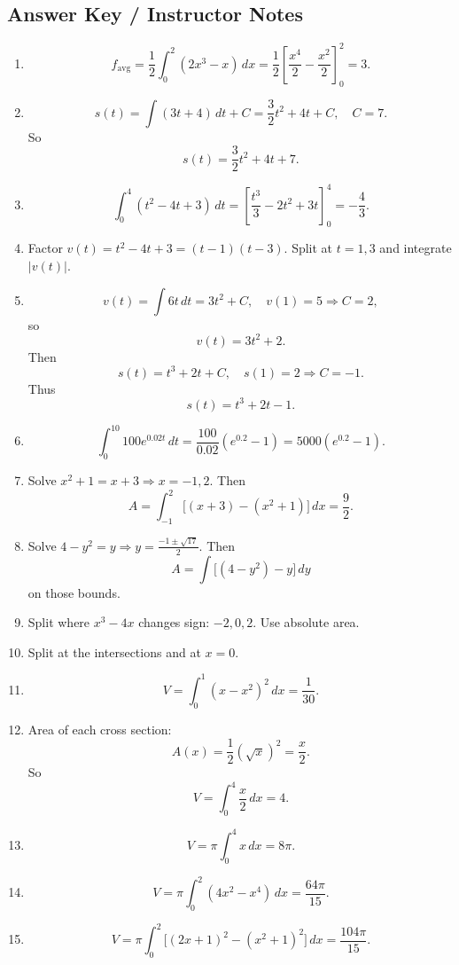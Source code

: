 \documentclass[11pt]{article}
\begin{document}
\newpage
\subsection{Answer Key / Instructor Notes}

\begin{enumerate}
    \item
    \[
    f_{\mathrm{avg}}=\frac12\int_0^2(2x^3-x)\,dx=\frac12\left[\frac{x^4}{2}-\frac{x^2}{2}\right]_0^2=3.
    \]

    \item
    \[
    s(t)=\int(3t+4)\,dt+C=\frac32 t^2+4t+C,\quad C=7.
    \]
    So
    \[
    s(t)=\frac32 t^2+4t+7.
    \]

    \item
    \[
    \int_0^4 (t^2-4t+3)\,dt=\left[\frac{t^3}{3}-2t^2+3t\right]_0^4=-\frac{4}{3}.
    \]

    \item Factor \(v(t)=t^2-4t+3=(t-1)(t-3)\). Split at \(t=1,3\) and integrate \(|v(t)|\).

    \item
    \[
    v(t)=\int 6t\,dt=3t^2+C,\quad v(1)=5\Rightarrow C=2,
    \]
    so
    \[
    v(t)=3t^2+2.
    \]
    Then
    \[
    s(t)=t^3+2t+C,\quad s(1)=2\Rightarrow C=-1.
    \]
    Thus
    \[
    s(t)=t^3+2t-1.
    \]

    \item
    \[
    \int_0^{10}100e^{0.02t}\,dt=\frac{100}{0.02}(e^{0.2}-1)=5000(e^{0.2}-1).
    \]

    \item Solve \(x^2+1=x+3\Rightarrow x=-1,2\). Then
    \[
    A=\int_{-1}^{2}\big[(x+3)-(x^2+1)\big]\,dx=\frac{9}{2}.
    \]

    \item Solve \(4-y^2=y\Rightarrow y=\frac{-1\pm \sqrt{17}}{2}\). Then
    \[
    A=\int \big[(4-y^2)-y\big]\,dy
    \]
    on those bounds.

    \item Split where \(x^3-4x\) changes sign: \(-2,0,2\). Use absolute area.

    \item Split at the intersections and at \(x=0\).

    \item
    \[
    V=\int_0^1 (x-x^2)^2\,dx=\frac{1}{30}.
    \]

    \item Area of each cross section:
    \[
    A(x)=\frac12(\sqrt{x})^2=\frac{x}{2}.
    \]
    So
    \[
    V=\int_0^4 \frac{x}{2}\,dx=4.
    \]

    \item
    \[
    V=\pi\int_0^4 x\,dx=8\pi.
    \]

    \item
    \[
    V=\pi\int_0^2 (4x^2-x^4)\,dx=\frac{64\pi}{15}.
    \]

    \item
    \[
    V=\pi\int_0^2 \big[(2x+1)^2-(x^2+1)^2\big]\,dx=\frac{104\pi}{15}.
    \]
\end{enumerate}
\end{document}
